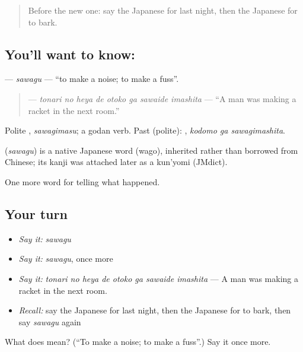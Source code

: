 \label{lesson:JA-C269-sawagu}



\begin{quote}
Before the new one: say the Japanese for last night, then the Japanese for to bark.
\end{quote}

\subsection*{You'll want to know: }
\textbf{} — \emph{sawagu} — \textquotedblleft{}to make a noise; to make a fuss\textquotedblright{}.

\begin{quote}
\textbf{   } — \emph{tonari no heya de otoko ga sawaide imashita} — \textquotedblleft{}A man was making a racket in the next room.\textquotedblright{}
\end{quote}

Polite \textbf{}, \emph{sawagimasu}; a godan verb. Past (polite): \textbf{ }, \emph{kodomo ga sawagimashita}.

\begin{cousinweb}
\textbf{} (\emph{sawagu}) is a native Japanese word (wago), inherited rather than borrowed from Chinese; its kanji was attached later as a kun'yomi (JMdict).
\end{cousinweb}

\begin{grammarlens}[title={What you've built}]
One more word for telling what happened.
\end{grammarlens}

\subsection*{Your turn}
\begin{itemize}
\raggedright
  \item \emph{Say it:} \emph{sawagu}
  \item \emph{Say it:} \emph{sawagu}, once more
  \item \emph{Say it:} \emph{tonari no heya de otoko ga sawaide imashita} — A man was making a racket in the next room.
  \item \emph{Recall:} say the Japanese for last night, then the Japanese for to bark, then say \emph{sawagu} again
\end{itemize}

\begin{tcolorbox}[breakable,colback=teal!4,colframe=teal!35!black,title={Before you move on}]
What does  mean? (\textquotedblleft{}To make a noise; to make a fuss\textquotedblright{}.) Say it once more.
\end{tcolorbox}
